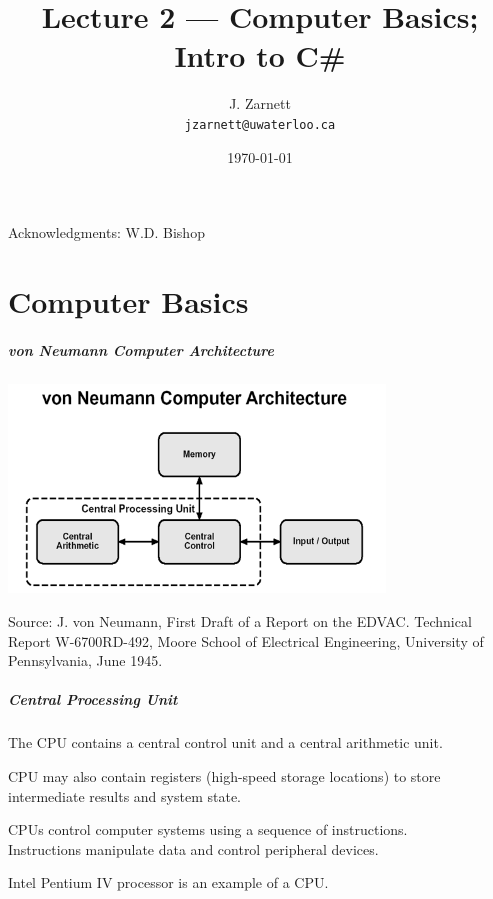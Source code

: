 

\title{Lecture 2 --- Computer Basics; Intro to C\#}

\author{J. Zarnett\\
\texttt{jzarnett@uwaterloo.ca}}
\date{\today}



\begin{frame}
  \titlepage
  
  \begin{center}
  \small{Acknowledgments: W.D. Bishop}
  \end{center}
 \end{frame}
 
\part{Computer Basics}
\begin{frame}\partpage\end{frame}

\begin{frame}
\frametitle{von Neumann Computer Architecture}

\begin{center}
\includegraphics[width=0.75\textwidth]{images/vonNeumann.png}
\end{center}

\tiny{Source: J. von Neumann, First Draft of a Report on the EDVAC.  Technical Report W-6700RD-492, Moore School of Electrical Engineering, University of Pennsylvania, June 1945.}

\end{frame}

\begin{frame}
\frametitle{Central Processing Unit}

The CPU contains a central control unit and a central arithmetic unit.

CPU may also contain registers (high-speed storage locations) to store intermediate results and system state.

CPUs control computer systems using a sequence of instructions.\\
\quad Instructions manipulate data and control peripheral devices.

Intel Pentium IV processor is an example of a CPU.

\end{frame}

